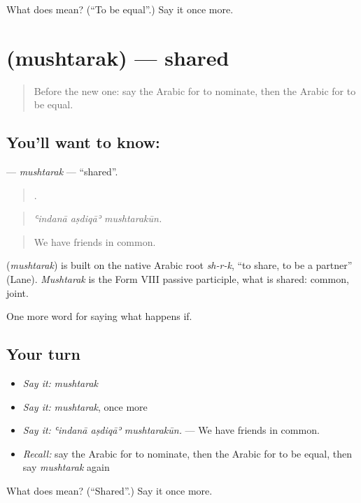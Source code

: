 \begin{tcolorbox}[breakable,colback=teal!4,colframe=teal!35!black,title={Before you move on}]
What does  mean? (\textquotedblleft{}To be equal\textquotedblright{}.) Say it once more.
\end{tcolorbox}
\section[\texorpdfstring{\ar{مشترك} (mushtarak)}{مشترك (mushtarak)}]{ (mushtarak) — shared}

\label{lesson:AR-C420-mushtarak}



\begin{quote}
Before the new one: say the Arabic for to nominate, then the Arabic for to be equal.
\end{quote}

\subsection*{You'll want to know: }
\textbf{} — \emph{mushtarak} — \textquotedblleft{}shared\textquotedblright{}.

\begin{quote}
  .
\end{quote}

\begin{quote}
\emph{ʿindanā aṣdiqāʾ mushtarakūn.}
\end{quote}

\begin{quote}
We have friends in common.
\end{quote}

\begin{cousinweb}
\textbf{} (\emph{mushtarak}) is built on the native Arabic root \emph{sh-r-k}, \textquotedblleft{}to share, to be a partner\textquotedblright{} (Lane). \emph{Mushtarak} is the Form VIII passive participle, what is shared: common, joint.
\end{cousinweb}

\begin{grammarlens}[title={What you've built}]
One more word for saying what happens if.
\end{grammarlens}

\subsection*{Your turn}
\begin{itemize}
\raggedright
  \item \emph{Say it:} \emph{mushtarak}
  \item \emph{Say it:} \emph{mushtarak}, once more
  \item \emph{Say it:} \emph{ʿindanā aṣdiqāʾ mushtarakūn.} — We have friends in common.
  \item \emph{Recall:} say the Arabic for to nominate, then the Arabic for to be equal, then say \emph{mushtarak} again
\end{itemize}

\begin{tcolorbox}[breakable,colback=teal!4,colframe=teal!35!black,title={Before you move on}]
What does  mean? (\textquotedblleft{}Shared\textquotedblright{}.) Say it once more.
\end{tcolorbox}
